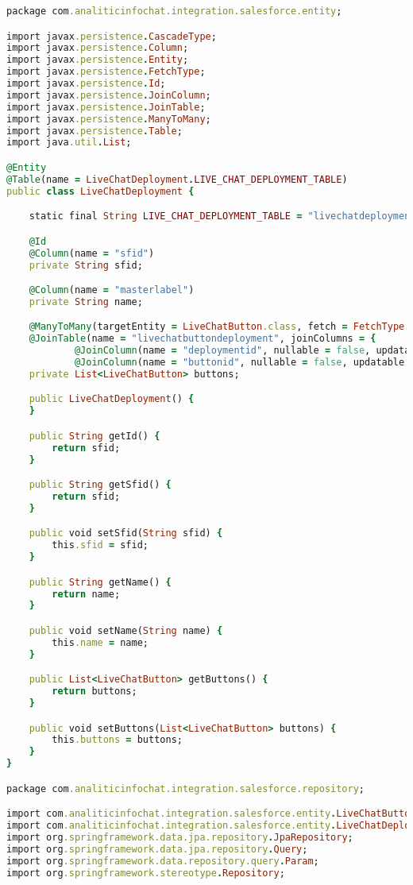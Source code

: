\begin{lstlisting}[language=Ruby, style=rubystyle]
package com.analiticinfochat.integration.salesforce.entity;

import javax.persistence.CascadeType;
import javax.persistence.Column;
import javax.persistence.Entity;
import javax.persistence.FetchType;
import javax.persistence.Id;
import javax.persistence.JoinColumn;
import javax.persistence.JoinTable;
import javax.persistence.ManyToMany;
import javax.persistence.Table;
import java.util.List;

@Entity
@Table(name = LiveChatDeployment.LIVE_CHAT_DEPLOYMENT_TABLE)
public class LiveChatDeployment {

    static final String LIVE_CHAT_DEPLOYMENT_TABLE = "livechatdeployment";

    @Id
    @Column(name = "sfid")
    private String sfid;

    @Column(name = "masterlabel")
    private String name;

    @ManyToMany(targetEntity = LiveChatButton.class, fetch = FetchType.EAGER, cascade = CascadeType.ALL)
    @JoinTable(name = "livechatbuttondeployment", joinColumns = {
            @JoinColumn(name = "deploymentid", nullable = false, updatable = false) }, inverseJoinColumns = {
            @JoinColumn(name = "buttonid", nullable = false, updatable = false) })
    private List<LiveChatButton> buttons;

    public LiveChatDeployment() {
    }

    public String getId() {
        return sfid;
    }

    public String getSfid() {
        return sfid;
    }

    public void setSfid(String sfid) {
        this.sfid = sfid;
    }

    public String getName() {
        return name;
    }

    public void setName(String name) {
        this.name = name;
    }

    public List<LiveChatButton> getButtons() {
        return buttons;
    }

    public void setButtons(List<LiveChatButton> buttons) {
        this.buttons = buttons;
    }
}

package com.analiticinfochat.integration.salesforce.repository;

import com.analiticinfochat.integration.salesforce.entity.LiveChatButton;
import com.analiticinfochat.integration.salesforce.entity.LiveChatDeployment;
import org.springframework.data.jpa.repository.JpaRepository;
import org.springframework.data.jpa.repository.Query;
import org.springframework.data.repository.query.Param;
import org.springframework.stereotype.Repository;


\end{lstlisting}
